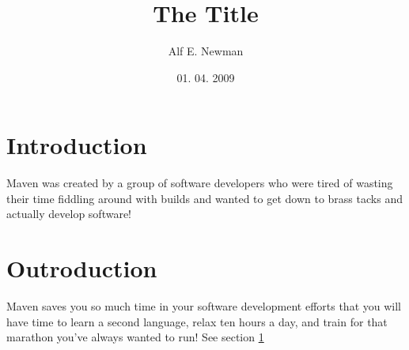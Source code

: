 \documentclass[11pt]{article}
\begin{document}
\title{The Title}
\author{Alf E. Newman}
\date{01. 04. 2009}
\maketitle

\section{Introduction}\label{sec_Introduction}

Maven was created by a group of software developers 
who were tired of wasting their time fiddling around with builds 
and wanted to get down to brass tacks and actually develop software!

\section{Outroduction}
Maven saves you so much time in your software development efforts 
that you will have time to learn a second language, relax ten hours a day, 
and train for that marathon you've always wanted to run! See section \ref{sec_Introduction}
  
\end{document}
